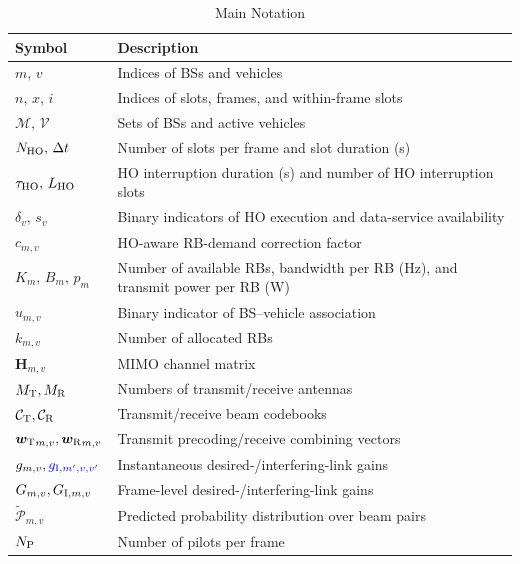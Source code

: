 \documentclass[conference, a4paper]{IEEEtran}
\newcommand{\rev}[1]{\textcolor{revisioncolor}{{}#1}}
\theoremstyle{remark}
\begin{document}
\begin{table}[t]
    \centering
    \color{revisioncolor}
    \caption{Main Notation}
    \label{tab:notation}
    \small
    \begin{tabular}{@{}>{\raggedright\arraybackslash}p{}>{\raggedright\arraybackslash}p{}@{}}
        \toprule
        \textbf{Symbol} & \textbf{Description} \\
        \midrule
        $m,\,v$ & Indices of BSs and vehicles \\
        $n,\,x,\,i$ & Indices of slots, frames, and within-frame slots \\
        $\mathcal{M},\,\mathcal{V}$ & Sets of BSs and active vehicles \\
        $N_{\rm HO},\,\Delta t$ & Number of slots per frame and slot duration (s) \\
        \rev{$\tau_{\rm HO},\,L_{\rm HO}$} & \rev{HO interruption duration (s) and number of HO interruption slots} \\
        \rev{$\delta_v,\,s_v$} & \rev{Binary indicators of HO execution and data-service availability} \\
        \rev{$c_{m,v}$} & \rev{HO-aware RB-demand correction factor} \\
        $K_m,\,B_m,\,p_m$ & Number of available RBs, bandwidth per RB (Hz), and transmit power per RB (W) \\
        $u_{m,v}$ & Binary indicator of BS--vehicle association \\
        $k_{m,v}$ & Number of allocated RBs\\
        $\boldsymbol{H}_{m,v}$ & MIMO channel matrix \\
        $M_{\rm T} , M_{\rm R}$ & Numbers of transmit/receive antennas \\
        $\mathcal{C}_{\rm T} , \mathcal{C}_{\rm R}$ & Transmit/receive beam codebooks \\
        $ {\bm{w}_{\rm T}}_{m,v} , {\bm{w}_{\rm R}}_{m,v}$ & Transmit precoding/receive combining vectors \\
        $g_{m,v} , \rev{g_{{\rm I},m',v,v'}}$ & Instantaneous desired-/interfering-link gains \\
        $G_{m,v} , G_{{\rm I},m,v}$ & Frame-level desired-/interfering-link gains \\
        $\tilde{\mathcal P}_{m,v}$ & Predicted probability distribution over beam pairs \\
        $N_{\rm P}$ & Number of pilots per frame\\

\end{tabular}
\end{table}
\end{document}
